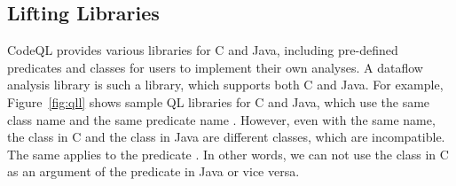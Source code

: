 
\subsection{Lifting Libraries}

CodeQL provides various libraries for C and Java, including
pre-defined predicates and classes for users to implement their own analyses.
A dataflow analysis library is such a library, which supports both C and Java.
For example, Figure~\ref{fig:qll} shows sample QL libraries for C and Java,
which use the same class name  and the same predicate
name .
However, even with the same name, the class  in C and the
class  in Java are different classes, which are incompatible.
The same applies to the predicate .
In other words, we can not use the class  in C as an
argument of the predicate  in Java or vice versa.

